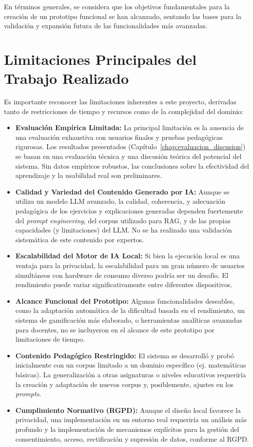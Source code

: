 En términos generales, se considera que los objetivos fundamentales para la creación de un prototipo funcional se han alcanzado, sentando las bases para la validación y expansión futura de las funcionalidades más avanzadas.

\section{Limitaciones Principales del Trabajo Realizado}
\label{sec:conclusiones_limitaciones}

Es importante reconocer las limitaciones inherentes a este proyecto, derivadas tanto de restricciones de tiempo y recursos como de la complejidad del dominio:

\begin{itemize}
    \item \textbf{Evaluación Empírica Limitada:} La principal limitación es la ausencia de una evaluación exhaustiva con usuarios finales y pruebas pedagógicas rigurosas. Los resultados presentados (Capítulo~\ref{chap:evaluacion_discusion}) se basan en una evaluación técnica y una discusión teórica del potencial del sistema. Sin datos empíricos robustos, las conclusiones sobre la efectividad del aprendizaje y la usabilidad real son preliminares.
    \item \textbf{Calidad y Variedad del Contenido Generado por IA:} Aunque se utiliza un modelo LLM avanzado, la calidad, coherencia, y adecuación pedagógica de los ejercicios y explicaciones generadas dependen fuertemente del \emph{prompt engineering}, del corpus utilizado para RAG, y de las propias capacidades (y limitaciones) del LLM. No se ha realizado una validación sistemática de este contenido por expertos.
    \item \textbf{Escalabilidad del Motor de IA Local:} Si bien la ejecución local es una ventaja para la privacidad, la escalabilidad para un gran número de usuarios simultáneos con hardware de consumo diverso podría ser un desafío. El rendimiento puede variar significativamente entre diferentes dispositivos.
    \item \textbf{Alcance Funcional del Prototipo:} Algunas funcionalidades deseables, como la adaptación automática de la dificultad basada en el rendimiento, un sistema de gamificación más elaborado, o herramientas analíticas avanzadas para docentes, no se incluyeron en el alcance de este prototipo por limitaciones de tiempo.
    \item \textbf{Contenido Pedagógico Restringido:} El sistema se desarrolló y probó inicialmente con un corpus limitado a un dominio específico (ej. matemáticas básicas). La generalización a otras asignaturas o niveles educativos requeriría la creación y adaptación de nuevos corpus y, posiblemente, ajustes en los \emph{prompts}.
    \item \textbf{Cumplimiento Normativo (RGPD):} Aunque el diseño local favorece la privacidad, una implementación en un entorno real requeriría un análisis más profundo y la implementación de mecanismos explícitos para la gestión del consentimiento, acceso, rectificación y supresión de datos, conforme al RGPD.
\end{itemize}

